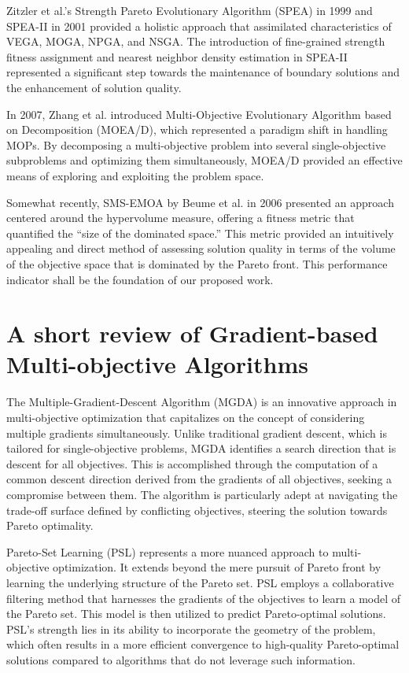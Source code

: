 \documentclass[%
 reprint,
 amsmath,amssymb,
 aps,
]{revtex4-2}
\begin{document}
Zitzler et al.'s Strength Pareto Evolutionary Algorithm (SPEA) in 1999 and SPEA-II in 2001 provided a holistic approach that assimilated characteristics of VEGA, MOGA, NPGA, and NSGA. The introduction of fine-grained strength fitness assignment and nearest neighbor density estimation in SPEA-II represented a significant step towards the maintenance of boundary solutions and the enhancement of solution quality.

In 2007, Zhang et al. introduced Multi-Objective Evolutionary Algorithm based on Decomposition (MOEA/D), which represented a paradigm shift in handling MOPs. By decomposing a multi-objective problem into several single-objective subproblems and optimizing them simultaneously, MOEA/D provided an effective means of exploring and exploiting the problem space.

Somewhat recently, SMS-EMOA by Beume et al. in 2006 presented an approach centered around the hypervolume measure, offering a fitness metric that quantified the “size of the dominated space.” This metric provided an intuitively appealing and direct method of assessing solution quality in terms of the volume of the objective space that is dominated by the Pareto front. This performance indicator shall be the foundation of our proposed work.

\section{\label{sec:level1}	
A short review of Gradient-based Multi-objective Algorithms}


The Multiple-Gradient-Descent Algorithm (MGDA) is an innovative approach in multi-objective optimization that capitalizes on the concept of considering multiple gradients simultaneously. Unlike traditional gradient descent, which is tailored for single-objective problems, MGDA identifies a search direction that is descent for all objectives. This is accomplished through the computation of a common descent direction derived from the gradients of all objectives, seeking a compromise between them. The algorithm is particularly adept at navigating the trade-off surface defined by conflicting objectives, steering the solution towards Pareto optimality.

Pareto-Set Learning (PSL) represents a more nuanced approach to multi-objective optimization. It extends beyond the mere pursuit of Pareto front by learning the underlying structure of the Pareto set. PSL employs a collaborative filtering method that harnesses the gradients of the objectives to learn a model of the Pareto set. This model is then utilized to predict Pareto-optimal solutions. PSL’s strength lies in its ability to incorporate the geometry of the problem, which often results in a more efficient convergence to high-quality Pareto-optimal solutions compared to algorithms that do not leverage such information.
\end{document}
